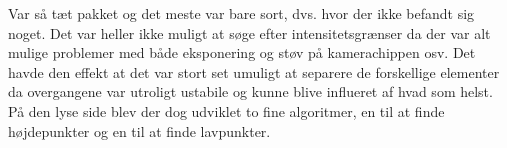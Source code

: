 Var så tæt pakket og det meste var bare sort, dvs. hvor der ikke befandt sig noget. Det var heller ikke muligt at søge efter intensitetsgrænser da der var alt mulige problemer med både eksponering og støv på kamerachippen osv.
Det havde den effekt at det var stort set umuligt at separere de forskellige elementer da overgangene var utroligt ustabile og kunne blive influeret af hvad som helst. På den lyse side blev der dog udviklet to fine algoritmer, en til at finde højdepunkter og en til at finde lavpunkter.




